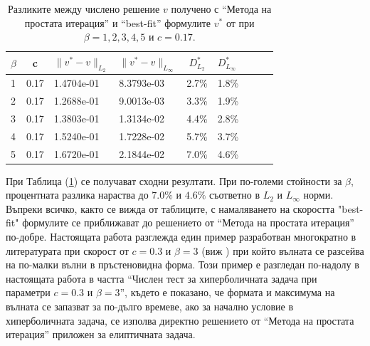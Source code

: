 \documentclass{article}
\newcommand{\rf}[1]{(\ref{#1})}
\begin{document}
\begin{table}[ht]
\centering
\begin{tabular}{|l|c|l l| c|l|c|l l|}
\hline 
\hline 
$\beta$	& c 	& $\|v^*-v \|_{L_2 }$ & $\|v^*-v \|_{L_\infty }$  	& $D^*_{L_2}$	& $D^*_{L_\infty }$	\\
\hline 
1& 		0.17&	1.4704e-01 		& 	8.3793e-03 				& 2.7\%			& 1.8\%		\\
\hline 
2& 		0.17&	1.2688e-01 		& 	9.0013e-03				& 3.3\%			& 1.9\%		\\
\hline 
3& 		0.17&	1.3803e-01 		& 	1.3134e-02				& 4.4\%			& 2.8\%		\\
\hline 
4& 		0.17&	 1.5240e-01 		& 	1.7228e-02				& 5.7\%			& 3.7\%		\\
\hline 
5& 		0.17&	1.6720e-01 		& 	2.1844e-02				& 7.0\%			& 4.6\%		\\
\hline 
\hline 
\end{tabular}
\caption{Разликите между числено решение $v$ получено с ``Метода на простата итерация'' и ``best-fit'' формулите $v^*$ от \cite{Ch2011} при $\beta=1, 2, 3, 4, 5$ и $c=0.17$.}
\label{tab:diff-c017}
\end{table}
При Таблица \rf{tab:diff-c017} се получават сходни резултати. При по-големи стойности за $\beta$, процентната разлика нараства до $7.0\%$ и $4.6\%$ съответно в $L_2$ и $L_\infty$ норми. Въпреки всичко, както се вижда от таблиците, с намаляването на скоростта "best-fit" формулите се приближават до решението от ``Метода на простата итерация'' по-добре. Настоящата работа разглежда един пример разработван многократно в литературата при скорост от $c=0.3$ и $\beta = 3$ (виж \cite{ref21, dani, milenaDani, ref22}) при който вълната се разсейва на по-малки вълни в пръстеновидна форма. Този пример е разгледан по-надолу в настоящата работа в частта ``Числен тест за хиперболичната задача при параметри $c=0.3$ и $\beta = 3$'', където е показано, че формата и максимума на вълната се запазват за по-дълго времеве, ако за начално условие в хиперболичната задача, се изполва директно решението от ``Метода на простата итерация'' приложен за елиптичната задача. 
\end{document}
